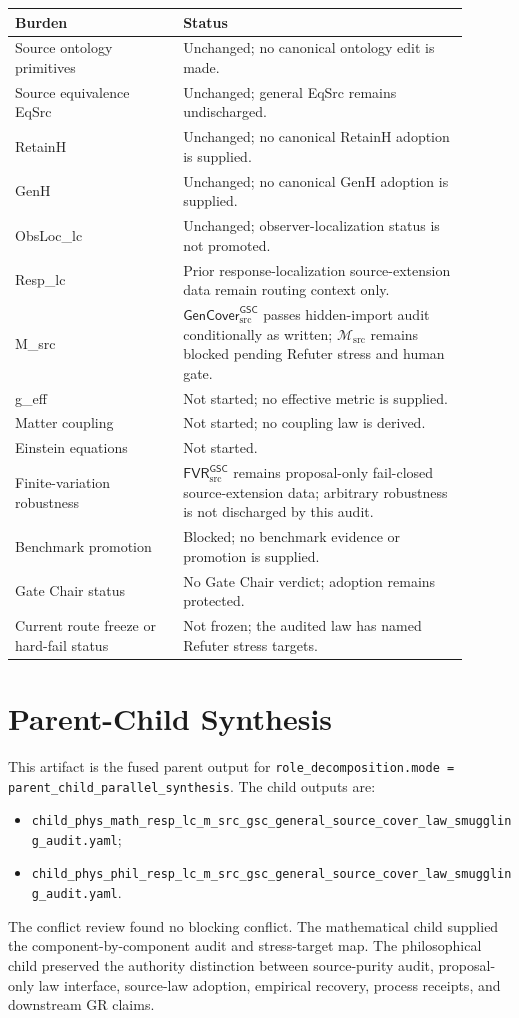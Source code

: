 \documentclass[11pt]{article}
\newcommand{\Msrc}{\mathcal{M}_{\mathrm{src}}}
\newcommand{\FVRSrc}{\mathsf{FVR}_{\mathrm{src}}^{\mathsf{GSC}}}
\newcommand{\GenCover}{\mathsf{GenCover}_{\mathrm{src}}^{\mathsf{GSC}}}
\begin{document}
\begin{center}
\begin{tabular}{p{0.33\linewidth}p{0.57\linewidth}}
\hline
Burden & Status \\
\hline
Source ontology primitives & Unchanged; no canonical ontology edit is made. \\
Source equivalence EqSrc & Unchanged; general EqSrc remains undischarged. \\
RetainH & Unchanged; no canonical RetainH adoption is supplied. \\
GenH & Unchanged; no canonical GenH adoption is supplied. \\
ObsLoc\_lc & Unchanged; observer-localization status is not promoted. \\
Resp\_lc & Prior response-localization source-extension data remain routing context only. \\
M\_src & \(\GenCover\) passes hidden-import audit conditionally as written; \(\Msrc\) remains blocked pending Refuter stress and human gate. \\
g\_eff & Not started; no effective metric is supplied. \\
Matter coupling & Not started; no coupling law is derived. \\
Einstein equations & Not started. \\
Finite-variation robustness & \(\FVRSrc\) remains proposal-only fail-closed source-extension data; arbitrary robustness is not discharged by this audit. \\
Benchmark promotion & Blocked; no benchmark evidence or promotion is supplied. \\
Gate Chair status & No Gate Chair verdict; adoption remains protected. \\
Current route freeze or hard-fail status & Not frozen; the audited law has named Refuter stress targets. \\
\hline
\end{tabular}
\end{center}

\section{Parent-Child Synthesis}

This artifact is the fused parent output for
\texttt{role\_decomposition.mode = parent\_child\_parallel\_synthesis}. The
child outputs are:
\begin{itemize}
  \item \texttt{child\_phys\_math\_resp\_lc\_m\_src\_gsc\_general\_source\_cover\_law\_smuggling\_audit.yaml};
  \item \texttt{child\_phys\_phil\_resp\_lc\_m\_src\_gsc\_general\_source\_cover\_law\_smuggling\_audit.yaml}.
\end{itemize}
The conflict review found no blocking conflict. The mathematical child
supplied the component-by-component audit and stress-target map. The
philosophical child preserved the authority distinction between source-purity
audit, proposal-only law interface, source-law adoption, empirical recovery,
process receipts, and downstream GR claims.
\end{document}
